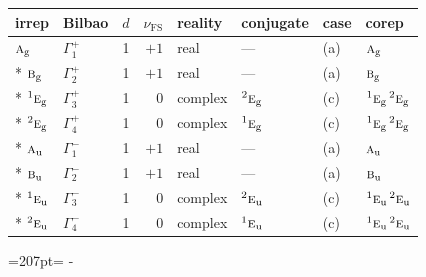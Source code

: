 \documentclass[10pt,a4paper]{article}
\newcommand{\needspace}[1]{\par\penalty-100\begingroup\dimen0=#1\relax\dimen2=\pagegoal
  \advance\dimen2-\pagetotal\ifdim\dimen0>\dimen2\relax\ifdim\dimen2>0pt\vfil\break\fi\fi
  \endgroup}
\numberwithin{equation}{section}
\newcommand{\irr}[1]{\text{\normalfont\scshape #1}}
\newcommand{\conjpair}[1]{{}^{#1}}
\newcommand{\ptag}[1]{\mathrm{#1}}
\newcommand{\fsind}{\nu_{\mathrm{FS}}}
\begin{document}
{\small\renewcommand{\arraystretch}{1.25}\setlength{\tabcolsep}{4pt}\begin{longtable}{@{}llrrllll@{}}\toprule
irrep & Bilbao & $d$ & $\fsind$ & reality & conjugate & case & corep\\\midrule\endhead
\bottomrule\endfoot\endlastfoot
$\irr{a}_{\ptag{g}}$ & $\Gamma_{1}^{+}$ & 1 & $+1$ & real & --- & (a) & $\irr{a}_{\ptag{g}}$\\*
$\irr{b}_{\ptag{g}}$ & $\Gamma_{2}^{+}$ & 1 & $+1$ & real & --- & (a) & $\irr{b}_{\ptag{g}}$\\*
$\conjpair{1}\irr{e}_{\ptag{g}}$ & $\Gamma_{3}^{+}$ & 1 & $0$ & complex & $\conjpair{2}\irr{e}_{\ptag{g}}$ & (c) & $\conjpair{1}\irr{e}_{\ptag{g}}\,\conjpair{2}\irr{e}_{\ptag{g}}$\\*
$\conjpair{2}\irr{e}_{\ptag{g}}$ & $\Gamma_{4}^{+}$ & 1 & $0$ & complex & $\conjpair{1}\irr{e}_{\ptag{g}}$ & (c) & $\conjpair{1}\irr{e}_{\ptag{g}}\,\conjpair{2}\irr{e}_{\ptag{g}}$\\*
$\irr{a}_{\ptag{u}}$ & $\Gamma_{1}^{-}$ & 1 & $+1$ & real & --- & (a) & $\irr{a}_{\ptag{u}}$\\*
$\irr{b}_{\ptag{u}}$ & $\Gamma_{2}^{-}$ & 1 & $+1$ & real & --- & (a) & $\irr{b}_{\ptag{u}}$\\*
$\conjpair{1}\irr{e}_{\ptag{u}}$ & $\Gamma_{3}^{-}$ & 1 & $0$ & complex & $\conjpair{2}\irr{e}_{\ptag{u}}$ & (c) & $\conjpair{1}\irr{e}_{\ptag{u}}\,\conjpair{2}\irr{e}_{\ptag{u}}$\\*
$\conjpair{2}\irr{e}_{\ptag{u}}$ & $\Gamma_{4}^{-}$ & 1 & $0$ & complex & $\conjpair{1}\irr{e}_{\ptag{u}}$ & (c) & $\conjpair{1}\irr{e}_{\ptag{u}}\,\conjpair{2}\irr{e}_{\ptag{u}}$\\
\bottomrule\end{longtable}}
\needspace{207pt}
\end{document}
